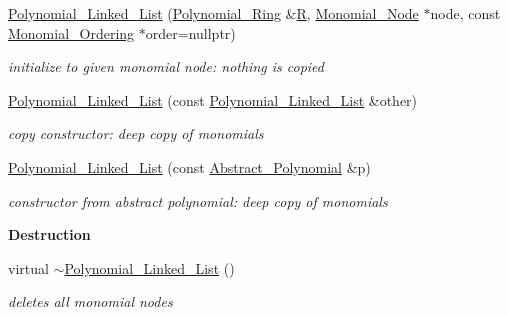 \begin{Indent}
\begin{DoxyCompactItemize}
\mbox{\label{group__polygroup_a67949390f9d60f7cc3a0e9eef8b60e37}} 
\hyperlink{group__polygroup_a67949390f9d60f7cc3a0e9eef8b60e37}{Polynomial\+\_\+\+Linked\+\_\+\+List} (\hyperlink{group__polygroup_class_polynomial___ring}{Polynomial\+\_\+\+Ring} \&\hyperlink{group__polygroup_a551ade20b7dcd96c227dd0401f6ffbbe}{R}, \hyperlink{group__polygroup_class_monomial___node}{Monomial\+\_\+\+Node} $\ast$node, const \hyperlink{group__orderinggroup_class_monomial___ordering}{Monomial\+\_\+\+Ordering} $\ast$order=nullptr)
\begin{DoxyCompactList}\small\item\em initialize to given monomial node\+: nothing is copied \end{DoxyCompactList}\item 
\mbox{\label{group__polygroup_abd37d81f9f973f93d380425882b0b7d6}} 
\hyperlink{group__polygroup_abd37d81f9f973f93d380425882b0b7d6}{Polynomial\+\_\+\+Linked\+\_\+\+List} (const \hyperlink{group__polygroup_class_polynomial___linked___list}{Polynomial\+\_\+\+Linked\+\_\+\+List} \&other)
\begin{DoxyCompactList}\small\item\em copy constructor\+: deep copy of monomials \end{DoxyCompactList}\item 
\mbox{\label{group__polygroup_a347fda55f27fa10327c9854913d416ce}} 
\hyperlink{group__polygroup_a347fda55f27fa10327c9854913d416ce}{Polynomial\+\_\+\+Linked\+\_\+\+List} (const \hyperlink{group__polygroup_class_abstract___polynomial}{Abstract\+\_\+\+Polynomial} \&p)
\begin{DoxyCompactList}\small\item\em constructor from abstract polynomial\+: deep copy of monomials \end{DoxyCompactList}\end{DoxyCompactItemize}
\end{Indent}
\begin{Indent}\textbf{ Destruction}\par
\begin{DoxyCompactItemize}
\item 
\mbox{\label{group__polygroup_a02235c20d279afa443ea836fd9336cfc}} 
virtual \hyperlink{group__polygroup_a02235c20d279afa443ea836fd9336cfc}{$\sim$\+Polynomial\+\_\+\+Linked\+\_\+\+List} ()
\begin{DoxyCompactList}\small\item\em deletes all monomial nodes \end{DoxyCompactList}\end{DoxyCompactItemize}
\end{Indent}
